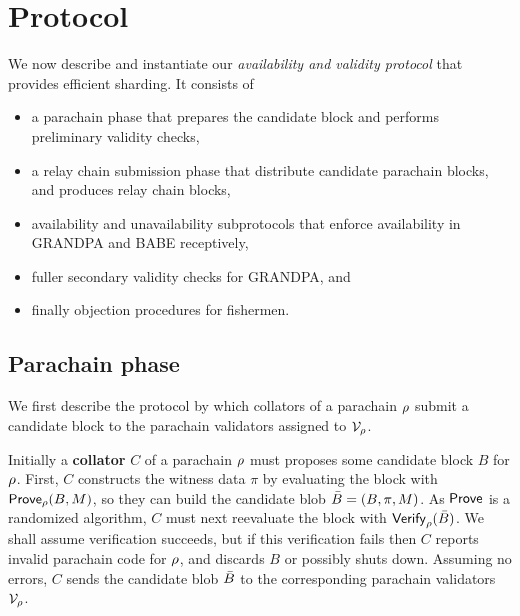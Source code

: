 
\section{Protocol} %
\label{sec:protocol}

We now describe and instantiate our {\em availability and validity protocol} that provides efficient sharding.  It consists of 
\begin{itemize}
\item a parachain phase that prepares the candidate block and performs preliminary validity checks,
\item a relay chain submission phase that distribute candidate parachain blocks, and produces relay chain blocks,
\item availability and unavailability subprotocols that enforce availability in GRANDPA and BABE receptively,
\item fuller secondary validity checks for GRANDPA, and
\item finally objection procedures for fishermen.
\end{itemize}



\subsection{Parachain phase} 

We first describe the protocol by which collators of a parachain $\rho$ submit a candidate block to the parachain validators assigned to $\mathcal{V}_{\rho}$.

\smallskip

Initially a {\bf collator} $C$ of a parachain $\rho$ must proposes some candidate block $B$ for $\rho$.  First, $C$ constructs the witness data $\pi$ by evaluating the block with $\mathsf{Prove}_{\rho}(B,M)$, so they can build the candidate blob $\bar{B} = (B,\pi,M)$.  As $\mathsf{Prove}$ is a randomized algorithm, $C$ must next reevaluate the block with $\mathsf{Verify}_{\rho}(\bar{B})$.  We shall assume verification succeeds, but if this verification fails then $C$ reports invalid parachain code for $\rho$, and discards $B$ or possibly shuts down.  Assuming no errors, $C$ sends the candidate blob $\bar{B}$ to the corresponding parachain validators $\mathcal{V}_{\rho}$.

